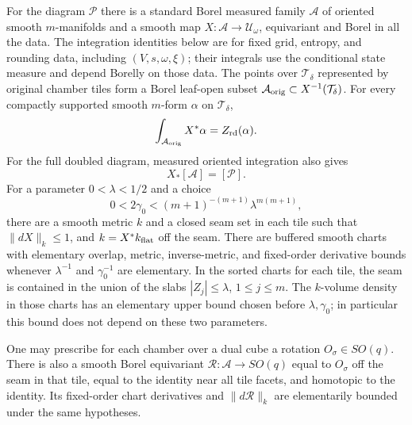 \begin{lemma}\label{lem:transfer-resolution}
For the diagram \(\mathcal P\) there is a standard Borel measured
family \(\mathcal A\) of oriented smooth \(m\)-manifolds and a smooth
map \(X:\mathcal A\to\mathcal U_\omega\), equivariant and Borel in
all the data.  The integration identities below are for fixed grid,
entropy, and rounding data, including \((V,s,\omega,\xi)\); their
integrals use the conditional state measure and depend Borelly on those
data.  The points over \(\mathcal T_\delta\) represented by
original chamber tiles form a Borel leaf-open subset
\(\mathcal A_{\rm orig}\subset X^{-1}(\mathcal T_\delta)\).  For every
compactly supported smooth \(m\)-form \(\alpha\) on \(\mathcal T_\delta\),
\begin{equation}\label{eq:transfer-local-push}
                 \int_{\mathcal A_{\rm orig}}X^*\alpha=Z_{\rm rd}(\alpha).
\end{equation}
For the full doubled diagram, measured oriented integration also gives
\begin{equation}\label{eq:transfer-push}
                 X_*[\mathcal A]=[\mathcal P].
\end{equation}
For a parameter \(0<\lambda<1/2\) and a choice
\begin{equation}\label{eq:transfer-gamma}
  0<2\gamma_0<(m+1)^{-(m+1)}\lambda^{m(m+1)},
\end{equation}
there are a smooth metric \(k\) and a closed seam set in each tile such
that \(\|dX\|_k\leq1\), and \(k=X^*k_{\rm flat}\) off the seam.
There are buffered smooth charts with elementary overlap, metric,
inverse-metric, and fixed-order derivative bounds whenever
\(\lambda^{-1}\) and \(\gamma_0^{-1}\) are elementary.  In the sorted
charts for each tile, the seam is contained in the union of the slabs
\(|Z_j|\leq\lambda\), \(1\leq j\leq m\).  The \(k\)-volume density
in those charts has an elementary upper bound chosen before
\(\lambda,\gamma_0\); in particular this bound does not depend on
these two parameters.

One may prescribe for each chamber over a dual cube a rotation
\(O_\sigma\in SO(q)\).  There is also a smooth Borel equivariant
\(\mathcal R:\mathcal A\to SO(q)\) equal to \(O_\sigma\) off the
seam in that tile, equal to the identity near all tile facets, and
homotopic to the identity.  Its fixed-order chart derivatives and
\(\|d\mathcal R\|_k\) are elementarily bounded under the same
hypotheses.
\end{lemma}

